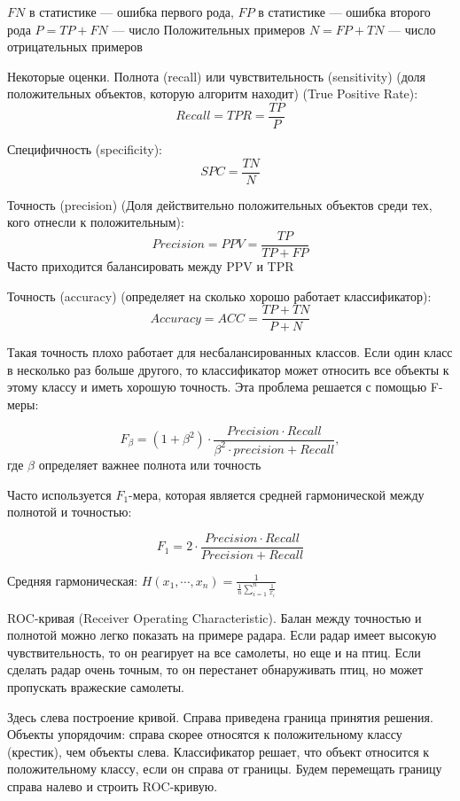 $FN$ в статистике --- ошибка первого рода,
$FP$ в статистике --- ошибка второго рода
$P = TP + FN$ --- число Положительных примеров
$N = FP + TN$ --- число отрицательных примеров

Некоторые оценки.
Полнота (recall) или чувствительность (sensitivity) (доля положительных объектов, которую алгоритм находит) (True Positive Rate):
\[
    Recall = TPR = \frac{TP}{P}
\]

Специфичность (specificity):
\[
    SPC = \frac{TN}{N}
\]

Точность (precision) (Доля действительно положительных объектов среди тех, кого отнесли к положительным):
\[
    Precision = PPV = \frac{TP}{TP + FP}
\]
Часто приходится балансировать между PPV и TPR

Точность (accuracy) (определяет на сколько хорошо работает классификатор):
\[
    Accuracy = ACC = \frac{TP + TN}{P + N}
\]

Такая точность плохо работает для несбалансированных классов. Если один класс
в несколько раз больше другого, то классификатор может относить все объекты
к этому классу и иметь хорошую точность. Эта проблема решается с помощью F-меры:

\[
    F_\beta = (1 + \beta^2) \cdot 
    \frac{Precision \cdot Recall}{\beta^2 \cdot precision + Recall},
\] где $\beta$ определяет важнее полнота или точность

Часто используется $F_1$-мера, которая является средней гармонической между
полнотой и точностью:

\[
    F_1 = 2 \cdot \frac{Precision \cdot Recall}{Precision + Recall}
\]

Средняя гармоническая: $H(x_1, \cdots, x_n) = \frac{1}{\frac{1}{n} \sum^n_{i = 1} \frac{1}{x_i}}$

ROC-кривая (Receiver Operating Characteristic). Балан между точностью и полнотой
можно легко показать на примере радара. Если радар имеет высокую чувствительность,
то он реагирует на все самолеты, но еще и на птиц. Если сделать радар очень точным,
то он перестанет обнаруживать птиц, но может пропускать вражеские самолеты.


Здесь слева построение кривой. Справа приведена граница принятия решения. Объекты упорядочим:
справа скорее относятся к положительному классу (крестик), чем объекты слева.
Классификатор решает, что объект относится к положительному классу, если он справа
от границы. Будем перемещать границу справа налево и строить ROC-кривую. 

